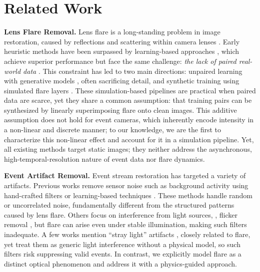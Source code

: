 \section{Related Work}
\label{sec:related_work}

\noindent\textbf{Lens Flare Removal.}
Lens flare is a long-standing problem in image restoration, caused by reflections and scattering within camera lenses \cite{fowles1989introduction,hullin2011physically,wu2021train}. Early heuristic methods \cite{asha2019auto,vitoria2019automatic} have been surpassed by learning-based approaches \cite{dai2023nighttime,dai2022flare7k,wu2021train,dai2024flare7k++,zhou2023improving,jiang2024mfdnet}, which achieve superior performance but face the same challenge: \textit{the lack of paired real-world data} \cite{dai2022flare7k,wu2021train}. This constraint has led to two main directions: unpaired learning with generative models \cite{qiao2021light}, often sacrificing detail, and synthetic training using simulated flare layers \cite{wu2021train,dai2022flare7k,dai2024flare7k++,zhou2023improving}. These simulation-based pipelines are practical when paired data are scarce, yet they share a common assumption: that training pairs can be synthesized by linearly superimposing flare onto clean images. This additive assumption does not hold for event cameras, which inherently encode intensity in a non-linear and discrete manner; to our knowledge, we are the first to characterize this non-linear effect and account for it in a simulation pipeline. Yet, all existing methods target static images; they neither address the asynchronous, high-temporal-resolution nature of event data nor flare dynamics.


\noindent\textbf{Event Artifact Removal.}
Event stream restoration has targeted a variety of artifacts. Previous works remove sensor noise such as background activity using hand-crafted filters \cite{shi2024polarity,wu2020probabilistic,guo2022low,feng2020event,wang2019ev,wang2020joint} or learning-based techniques \cite{duan2021eventzoom,rios2023within,baldwin2020event,duan2021guided,zhang2023neuromorphic}. These methods handle random or uncorrelated noise, fundamentally different from the structured patterns caused by lens flare. Others focus on interference from light sources, \eg, flicker removal \cite{wang2022linear,im2023live}, but flare can arise even under stable illumination, making such filters inadequate. A few works mention ``stray light'' artifacts \cite{shi2023identifying,shi2024polarity}, closely related to flare, yet treat them as generic light interference without a physical model, so such filters risk suppressing valid events. In contrast, we explicitly model flare as a distinct optical phenomenon and address it with a physics-guided approach.


